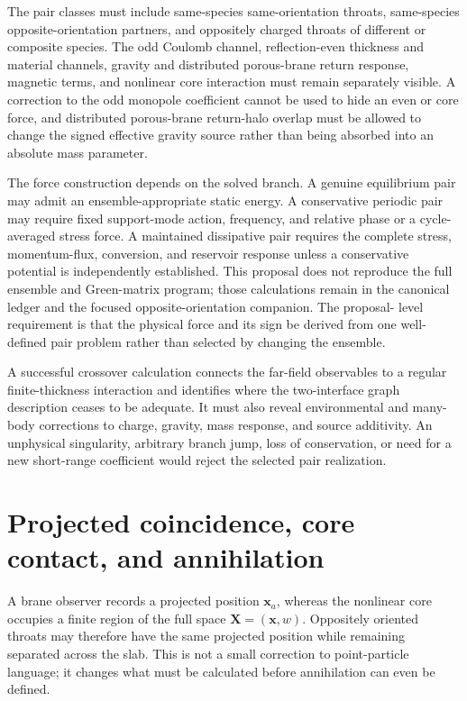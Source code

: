 The pair classes must include same-species same-orientation throats,
same-species opposite-orientation partners, and oppositely charged throats of
different or composite species. The odd Coulomb channel, reflection-even
thickness and material channels, gravity and distributed porous-brane return
response, magnetic terms, and nonlinear core interaction must remain separately
visible. A correction to
the odd monopole coefficient cannot be used to hide an even or core force, and
distributed porous-brane return-halo overlap must be allowed to change the signed
effective gravity source rather than being absorbed into an absolute mass
parameter.

The force construction depends on the solved branch. A genuine equilibrium pair
may admit an ensemble-appropriate static energy. A conservative periodic pair
may require fixed support-mode action, frequency, and relative phase or a
cycle-averaged stress force. A maintained dissipative pair requires the complete
stress, momentum-flux, conversion, and reservoir response unless a conservative
potential is independently established. This proposal does not reproduce the
full ensemble and Green-matrix program; those calculations remain in the
canonical ledger and the focused opposite-orientation companion. The proposal-
level requirement is that the physical force and its sign be derived from one
well-defined pair problem rather than selected by changing the ensemble.

A successful crossover calculation connects the far-field observables to a
regular finite-thickness interaction and identifies where the two-interface
graph description ceases to be adequate. It must also reveal environmental and
many-body corrections to charge, gravity, mass response, and source additivity.
An unphysical singularity, arbitrary branch jump, loss of conservation, or need
for a new short-range coefficient would reject the selected pair realization.

\section{Projected coincidence, core contact, and annihilation}

A brane observer records a projected position \(\mathbf x_a\), whereas the
nonlinear core occupies a finite region of the full space
\(\mathbf X=(\mathbf x,w)\). Oppositely oriented throats may therefore have the
same projected position while remaining separated across the slab. This is not
a small correction to point-particle language; it changes what must be calculated
before annihilation can even be defined.

